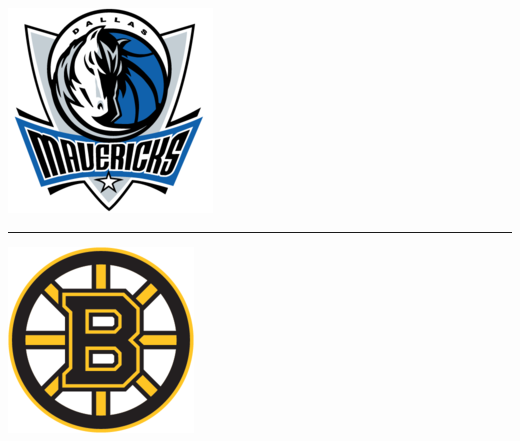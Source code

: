 \documentclass[landscape]{article}
\begin{document}
\begin{multicols}{3}
\begin{minipage}{0.1\linewidth}
	\includegraphics[width=\linewidth]{images/mavs-logo.png}
\end{minipage}
\begin{minipage}{0.9\linewidth}
	
\end{minipage}
\hrule
\begin{center}
	
\end{center}
\begin{minipage}{0.1\linewidth}
	\includegraphics[width=\linewidth]{images/bruins-logo.png}
\end{minipage}
\begin{minipage}{0.9\linewidth}
	
\end{minipage}


\end{multicols}
\end{document}
